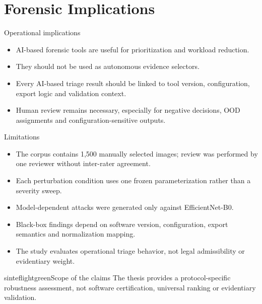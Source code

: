 \documentclass{beamer}
\begin{document}
\section{Forensic Implications}

\begin{frame}{Operational implications}

\begin{itemize}
    \item AI-based forensic tools are useful for prioritization and workload reduction.
    \item They should not be used as autonomous evidence selectors.
    \item Every AI-based triage result should be linked to tool version, configuration, export logic and validation context.
    \item Human review remains necessary, especially for negative decisions, OOD assignments and configuration-sensitive outputs.
\end{itemize}

\end{frame}


\begin{frame}{Limitations}

\small

\begin{itemize}
    \item The corpus contains 1,500 manually selected images; review was performed by one reviewer without inter-rater agreement.
    \item Each perturbation condition uses one frozen parameterization rather than a severity sweep.
    \item Model-dependent attacks were generated only against EfficientNet-B0.
    \item Black-box findings depend on software version, configuration, export semantics and normalization mapping.
    \item The study evaluates operational triage behavior, not legal admissibility or evidentiary weight.
\end{itemize}

\begin{colorblock}[black]{sinteflightgreen}{Scope of the claims}
The thesis provides a protocol-specific robustness assessment, not software certification, universal ranking or evidentiary validation.
\end{colorblock}

\end{frame}
\end{document}
